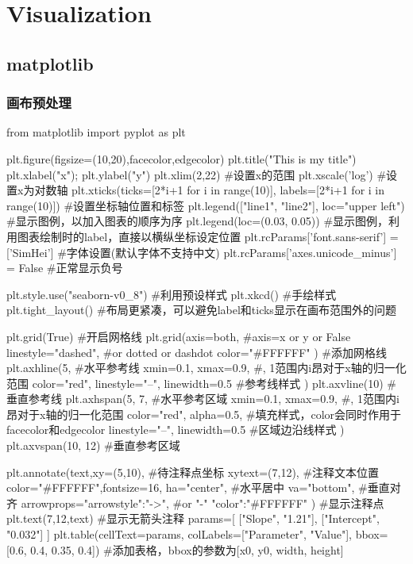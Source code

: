 \section{Visualization}

  \subsection{matplotlib}
    \subsubsection{画布预处理}
      \begin{codeblock}[language=python, caption={basic setup of plt}]
        from matplotlib import pyplot as plt

        plt.figure(figsize=(10,20),facecolor,edgecolor)
        plt.title("This is my title")
        plt.xlabel("x"); plt.ylabel("y")
        plt.xlim(2,22) #设置x的范围
        plt.xscale('log') #设置x为对数轴
        plt.xticks(ticks=[2*i+1 for i in range(10)], 
                   labels=[2*i+1 for i in range(10)]) #设置坐标轴位置和标签
        plt.legend(["line1", "line2"], loc="upper left") #显示图例，以加入图表的顺序为序
        plt.legend(loc=(0.03, 0.05)) #显示图例，利用图表绘制时的label，直接以横纵坐标设定位置
        plt.rcParams['font.sans-serif'] = ['SimHei'] #字体设置(默认字体不支持中文)
        plt.rcParams['axes.unicode_minus'] = False #正常显示负号

        plt.style.use("seaborn-v0_8") #利用预设样式
        plt.xkcd() #手绘样式
        plt.tight_layout() #布局更紧凑，可以避免label和ticks显示在画布范围外的问题

        plt.grid(True) #开启网格线
        plt.grid(axis=both, #axis=x or y or False
                linestyle="dashed", #or dotted or dashdot
                color="#FFFFFF"
        ) #添加网格线
        plt.axhline(5, #水平参考线
                    xmin=0.1, xmax=0.9, #, 1\rbrack 范围内i昂对于x轴的归一化范围
                    color="red", linestyle="--", linewidth=0.5 #参考线样式
        ) 
        plt.axvline(10) #垂直参考线
        plt.axhspan(5, 7, #水平参考区域
                    xmin=0.1, xmax=0.9, #, 1\rbrack 范围内i昂对于x轴的归一化范围
                    color="red", alpha=0.5, #填充样式，color会同时作用于facecolor和edgecolor
                    linestyle="--", linewidth=0.5 #区域边沿线样式
        ) 
        plt.axvspan(10, 12) #垂直参考区域

        plt.annotate(text,xy=(5,10), #待注释点坐标
                    xytext=(7,12), #注释文本位置
                    color="#FFFFFF",fontsize=16,
                    ha="center", #水平居中
                    va="bottom", #垂直对齐
                    arrowprops={"arrowstyle":"->", #or "-"
                                "color":"#FFFFFF"}
        ) #显示注释点
        plt.text(7,12,text) #显示无箭头注释
        params=[
          ["Slope", "1.21"],
          ["Intercept", "0.032"]
        ]
        plt.table(cellText=params, colLabels=["Parameter", "Value"], bbox=[0.6, 0.4, 0.35, 0.4])
          #添加表格，bbox的参数为[x0, y0, width, height]


\end{codeblock}
